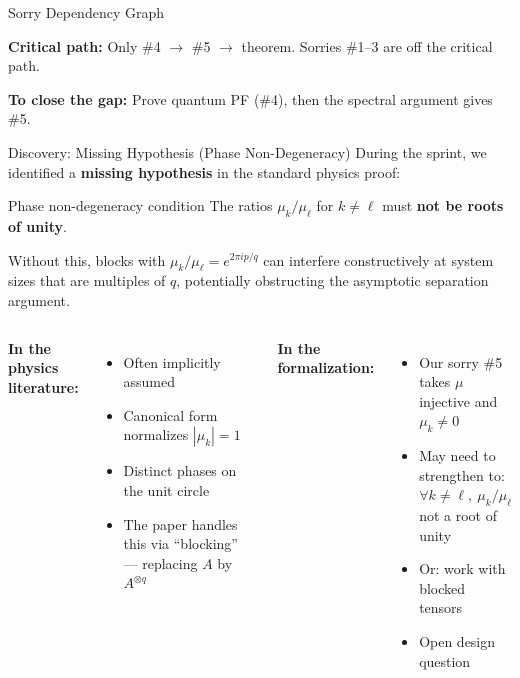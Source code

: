 \documentclass[aspectratio=169,10pt]{beamer}
\begin{document}
\begin{frame}{Sorry Dependency Graph}
\begin{center}
\begin{tikzpicture}
\end{tikzpicture}
\end{center}

\vspace{0.2em}
{\small\textbf{Critical path:} Only \textcolor{softred}{\#4 $\to$ \#5 $\to$ theorem}. Sorries \#1--3 are off the critical path.}

\vspace{0.1em}
{\small \textbf{To close the gap:} Prove quantum PF (\#4), then the spectral argument gives \#5.}
\end{frame}

\begin{frame}{Discovery: Missing Hypothesis (Phase Non-Degeneracy)}
\vspace{-0.3em}
{\small During the sprint, we identified a \textbf{missing hypothesis} in the standard physics proof:}

\vspace{0.3em}
\begin{block}{Phase non-degeneracy condition}
The ratios $\mu_k / \mu_\ell$ for $k \neq \ell$ must \textbf{not be roots of unity}.

Without this, blocks with $\mu_k / \mu_\ell = e^{2\pi i p/q}$ can interfere
constructively at system sizes that are multiples of $q$, potentially obstructing
the asymptotic separation argument.
\end{block}

\vspace{0.3em}
\begin{columns}[T]
{\small\textbf{In the physics literature:}}
\begin{itemize}\itemsep0.1em
  \item {\small Often implicitly assumed}
  \item {\small Canonical form normalizes $|\mu_k| = 1$}
  \item {\small Distinct phases on the unit circle}
  \item {\small The paper \cite{Cirac2021Matrix} handles this via ``blocking'' --- replacing $A$ by $A^{\otimes q}$}
\end{itemize}

{\small\textbf{In the formalization:}}
\begin{itemize}\itemsep0.1em
  \item {\small Our sorry \#5 takes $\mu$ injective and $\mu_k \neq 0$}
  \item {\small May need to strengthen to:\\
  $\forall k \neq \ell,\ \mu_k/\mu_\ell$ not a root of unity}
  \item {\small Or: work with blocked tensors}
  \item {\small \textcolor{amber}{Open design question}}
\end{itemize}
\end{columns}
\end{frame}
\end{document}
